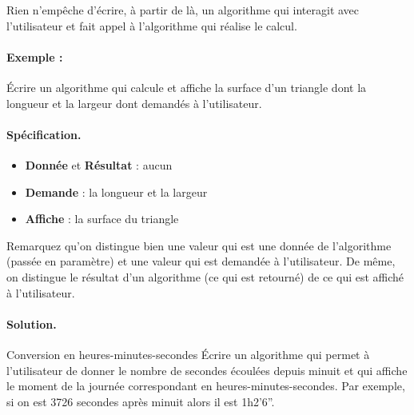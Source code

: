 			Rien n’empêche d’écrire, à partir de là,
			un algorithme qui interagit avec l’utilisateur
			et fait appel à l’algorithme qui réalise le calcul.
			
			\paragraph{Exemple :}
				Écrire un algorithme qui calcule et affiche la surface d'un triangle 
				dont la longueur et la largeur dont demandés à l'utilisateur.
				
			\paragraph{Spécification.}
			\begin{center}
			\end{center}
			\begin{itemize}
				\item \textbf{Donnée} et \textbf{Résultat} : aucun
				\item \textbf{Demande} : la longueur et la largeur
				\item \textbf{Affiche} : la surface du triangle
			\end{itemize}
			
			Remarquez qu'on distingue bien une valeur qui est une donnée de l'algorithme
			(passée en paramètre) et une valeur qui est demandée à l'utilisateur.
			De même, on distingue le résultat d'un algorithme (ce qui est retourné)
			de ce qui est affiché à l'utilisateur.
			
			\paragraph{Solution.}
						
			\begin{LDA}
				\EndAlgo
			\end{LDA}

			\begin{Exercice}{Conversion en heures-minutes-secondes}
				Écrire un algorithme qui permet à l’utilisateur
				de donner le nombre de secondes écoulées depuis minuit
				et qui affiche le moment de la journée correspondant
				en heures-minutes-secondes.
				Par exemple, si on est 3726 secondes après minuit
				alors il est 1h2'6''.
			\end{Exercice}
